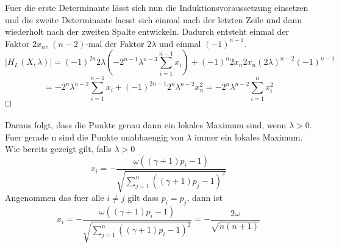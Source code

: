 \documentclass[11pt]{scrartcl}
\begin{document}
			Fuer die erste Determinante lässt sich nun die Induktionsvoraussetzung einsetzen und die zweite Determinante laesst sich einmal nach der letzten Zeile und dann wiederholt nach der zweiten Spalte entwickeln. Dadurch entsteht einmal der Faktor \(2x_{n}\), \((n-2)\)-mal der Faktor \(2\lambda\) und einmal \((-1)^{n-1}\).
			\begin{equation}
			|H_{L}(X,\lambda)|=(-1)^{2n}2\lambda(-2^{n-1}\lambda^{n-3}\sum_{i=1}^{n-1}x_{i})+(-1)^{n}2x_{n}2x_{n}(2\lambda)^{n-2}(-1)^{n-1}
			\end{equation}
			\begin{equation}
			=-2^{n}\lambda^{n-2}\sum_{i=1}^{n-1}x_{i}+(-1)^{2n-1}2^{n}\lambda^{n-2}x_{n}^{2}
			=-2^n\lambda^{n-2}\sum_{i=1}^{n}x_{i}^2
			\end{equation}
			$\hfill\square$\\\\
			Daraus folgt, dass die Punkte genau dann ein lokales Maximum sind, wenn \(\lambda>0\). Fuer gerade n sind die Punkte unabhaengig von \(\lambda\) immer ein lokales Maximum. Wie bereits gezeigt gilt, falls \(\lambda>0\)
			\begin{equation}
			x_{i}=-\frac{\omega((\gamma +1)p_{i}-1)}{\sqrt{\sum_{j=1}^{n}((\gamma +1)p_{j}-1)^2}}
			\end{equation}
			Angenommen das fuer alle \(i\neq j\) gilt dass \(p_{i}=p_{j}\), dann ist
			\begin{equation}
			x_{i}=-\frac{\omega((\gamma +1)p_{i}-1)}{\sqrt{\sum_{j=1}^{n}((\gamma +1)p_{i}-1)^2}}
			=-\frac{2\omega}{\sqrt{n(n+1)}}
			\end{equation}
\end{document}
